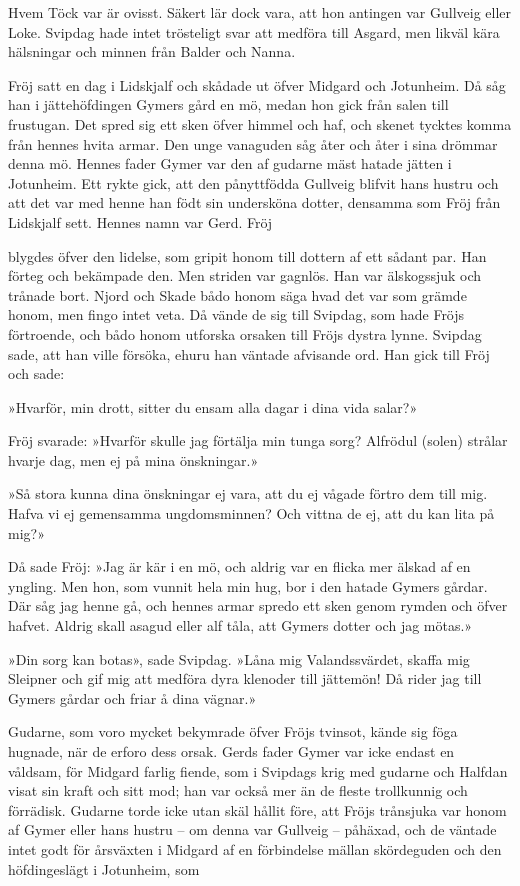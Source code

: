 Hvem Töck var är ovisst. Säkert lär dock vara, att hon antingen var
Gullveig eller Loke. Svipdag hade intet trösteligt svar att medföra till
Asgard, men likväl kära hälsningar och minnen från Balder och Nanna.



Fröj satt en dag i Lidskjalf och skådade ut öfver Midgard och Jotunheim.
Då såg han i jättehöfdingen Gymers gård en mö, medan hon gick från salen
till frustugan. Det spred sig ett sken öfver himmel och haf, och skenet
tycktes komma från hennes hvita armar. Den unge vanaguden såg åter och
åter i sina drömmar denna mö. Hennes fader Gymer var den af gudarne mäst
hatade jätten i Jotunheim. Ett rykte gick, att den pånyttfödda Gullveig
blifvit hans hustru och att det var med henne han födt sin undersköna
dotter, densamma som Fröj från Lidskjalf sett. Hennes namn var Gerd.
Fröj

blygdes öfver den lidelse, som gripit honom till dottern af ett sådant
par. Han förteg och bekämpade den. Men striden var gagnlös. Han var
älskogssjuk och trånade bort. Njord och Skade bådo honom säga hvad det
var som grämde honom, men fingo intet veta. Då vände de sig till
Svipdag, som hade Fröjs förtroende, och bådo honom utforska orsaken till
Fröjs dystra lynne. Svipdag sade, att han ville försöka, ehuru han
väntade afvisande ord. Han gick till Fröj och sade:

»Hvarför, min drott, sitter du ensam alla dagar i dina vida salar?»

Fröj svarade: »Hvarför skulle jag förtälja min tunga sorg? Alfrödul
(solen) strålar hvarje dag, men ej på mina önskningar.»

»Så stora kunna dina önskningar ej vara, att du ej vågade förtro dem
till mig. Hafva vi ej gemensamma ungdomsminnen? Och vittna de ej, att du
kan lita på mig?»

Då sade Fröj: »Jag är kär i en mö, och aldrig var en flicka mer älskad
af en yngling. Men hon, som vunnit hela min hug, bor i den hatade Gymers
gårdar. Där såg jag henne gå, och hennes armar spredo ett sken genom
rymden och öfver hafvet. Aldrig skall asagud eller alf tåla, att Gymers
dotter och jag mötas.»

»Din sorg kan botas», sade Svipdag. »Låna mig Valandssvärdet, skaffa mig
Sleipner och gif mig att medföra dyra klenoder till jättemön! Då rider
jag till Gymers gårdar och friar å dina vägnar.»

Gudarne, som voro mycket bekymrade öfver Fröjs tvinsot, kände sig föga
hugnade, när de erforo dess orsak. Gerds fader Gymer var icke endast en
våldsam, för Midgard farlig fiende, som i Svipdags krig med gudarne och
Halfdan visat sin kraft och sitt mod; han var också mer än de fleste
trollkunnig och förrädisk. Gudarne torde icke utan skäl hållit före, att
Fröjs trånsjuka var honom af Gymer eller hans hustru -- om denna var
Gullveig -- påhäxad, och de väntade intet godt för årsväxten i Midgard
af en förbindelse mällan skördeguden och den höfdingeslägt i Jotunheim,
som

